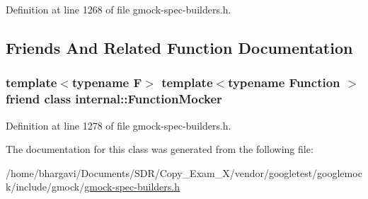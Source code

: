 Definition at line 1268 of file gmock-\/spec-\/builders.\+h.



\subsection{Friends And Related Function Documentation}
\subsubsection[{\texorpdfstring{internal\+::\+Function\+Mocker}{internal::FunctionMocker}}]{\setlength{\rightskip}{0pt plus 5cm}template$<$typename F$>$ template$<$typename Function $>$ friend class {\bf internal\+::\+Function\+Mocker}\hspace{0.3cm}{\ttfamily [friend]}}\hypertarget{classtesting_1_1internal_1_1_mock_spec_a6980863fff8693124aff79c507f87d45}{}\label{classtesting_1_1internal_1_1_mock_spec_a6980863fff8693124aff79c507f87d45}


Definition at line 1278 of file gmock-\/spec-\/builders.\+h.



The documentation for this class was generated from the following file\+:\begin{DoxyCompactItemize}
\item 
/home/bhargavi/\+Documents/\+S\+D\+R/\+Copy\+\_\+\+Exam\+\_\+X/vendor/googletest/googlemock/include/gmock/\hyperlink{gmock-spec-builders_8h}{gmock-\/spec-\/builders.\+h}\end{DoxyCompactItemize}
